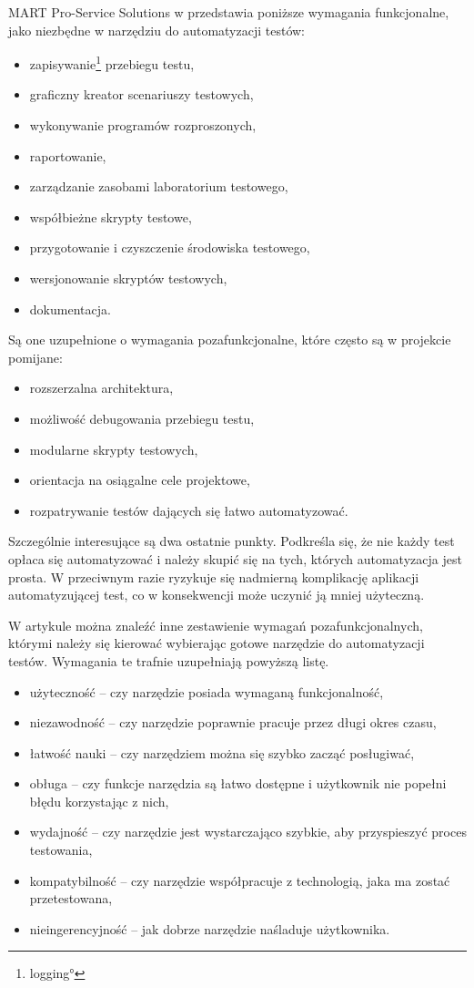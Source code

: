 \documentclass[00-praca-magisterska.tex]{subfiles}
\begin{document}
MART Pro-Service Solutions w \cite{automation-fail} przedstawia poniższe
wymagania funkcjonalne, jako niezbędne w narzędziu do automatyzacji testów:
\begin{itemize}
\item zapisywanie\footnote{\ang{logging}} przebiegu testu,
\item graficzny kreator scenariuszy testowych,
\item wykonywanie programów rozproszonych,
\item raportowanie,
\item zarządzanie zasobami laboratorium testowego,
\item współbieżne skrypty testowe,
\item przygotowanie i czyszczenie środowiska testowego,
\item wersjonowanie skryptów testowych,
\item dokumentacja.
\end{itemize}

Są one uzupełnione o wymagania pozafunkcjonalne, które często są w projekcie
pomijane:
\begin{itemize}
\item rozszerzalna architektura,
\item możliwość debugowania przebiegu testu,
\item modularne skrypty testowych,
\item orientacja na osiągalne cele projektowe,
\item rozpatrywanie testów dających się łatwo automatyzować.
\end{itemize}

Szczególnie interesujące są dwa ostatnie punkty. Podkreśla się, że nie każdy
test opłaca się automatyzować i należy skupić się na tych, których
automatyzacja jest prosta. W przeciwnym razie ryzykuje się nadmierną
komplikację aplikacji automatyzującej test, co w konsekwencji może uczynić ją
mniej użyteczną.

W artykule \cite{snake-oil} można znaleźć inne zestawienie wymagań
pozafunkcjonalnych, którymi należy się kierować wybierając gotowe narzędzie do
automatyzacji testów. Wymagania te trafnie uzupełniają powyższą listę.
\begin{itemize}
\item użyteczność -- czy narzędzie posiada wymaganą funkcjonalność,
\item niezawodność -- czy narzędzie poprawnie pracuje przez długi okres czasu,
\item łatwość nauki -- czy narzędziem można się szybko zacząć posługiwać,
\item obługa -- czy funkcje narzędzia są łatwo dostępne i użytkownik nie popełni błędu korzystając z nich,
\item wydajność -- czy narzędzie jest wystarczająco szybkie, aby przyspieszyć proces testowania,
\item kompatybilność -- czy narzędzie współpracuje z technologią, jaka ma zostać przetestowana,
\item nieingerencyjność -- jak dobrze narzędzie naśladuje użytkownika.
\end{itemize}
\end{document}
